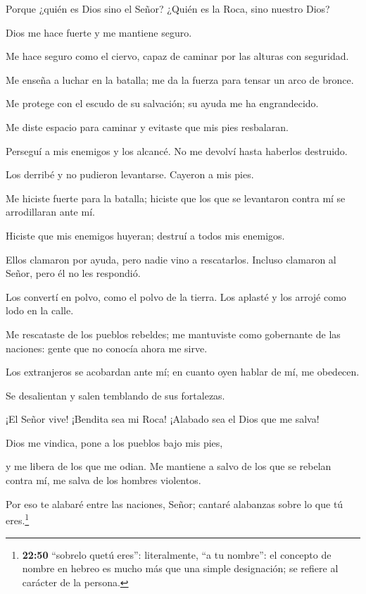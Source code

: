 Porque ¿quién es Dios sino el Señor? ¿Quién es la Roca,
sino nuestro Dios?

 Dios me hace fuerte y me mantiene seguro.

 Me hace seguro como el ciervo, capaz de caminar por las
alturas con seguridad.

 Me enseña a luchar en la batalla; me da la fuerza para
tensar un arco de bronce.

 Me protege con el escudo de su salvación; su ayuda me ha
engrandecido.

 Me diste espacio para caminar y evitaste que mis pies
resbalaran.

 Perseguí a mis enemigos y los alcancé. No me devolví hasta
haberlos destruido.

 Los derribé y no pudieron levantarse. Cayeron a mis pies.

 Me hiciste fuerte para la batalla; hiciste que los que se
levantaron contra mí se arrodillaran ante mí.

 Hiciste que mis enemigos huyeran; destruí a todos mis
enemigos.

 Ellos clamaron por ayuda, pero nadie vino a rescatarlos.
Incluso clamaron al Señor, pero él no les respondió.

 Los convertí en polvo, como el polvo de la tierra. Los
aplasté y los arrojé como lodo en la calle.

 Me rescataste de los pueblos rebeldes; me mantuviste como
gobernante de las naciones: gente que no conocía ahora me sirve.

 Los extranjeros se acobardan ante mí; en cuanto oyen
hablar de mí, me obedecen.

 Se desalientan y salen temblando de sus fortalezas.

 ¡El Señor vive! ¡Bendita sea mi Roca! ¡Alabado sea el Dios
que me salva!

 Dios me vindica, pone a los pueblos bajo mis pies,

 y me libera de los que me odian. Me mantiene a salvo de
los que se rebelan contra mí, me salva de los hombres violentos.

 Por eso te alabaré entre las naciones, Señor; cantaré
alabanzas sobre lo que tú eres.\footnote{\textbf{22:50} ``sobrelo quetú
  eres'': literalmente, ``a tu nombre'': el concepto de nombre en hebreo
  es mucho más que una simple designación; se refiere al carácter de la
  persona.}

